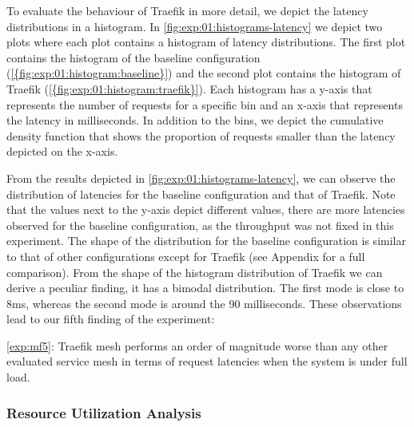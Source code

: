 To evaluate the behaviour of Traefik in more detail, we depict the latency distributions in a histogram. In \cref{fig:exp:01:histograms-latency} we depict two plots where each plot contains a histogram of latency distributions. The first plot contains the histogram of the baseline configuration (\cref{{fig:exp:01:histogram:baseline}}) and the second plot contains the histogram of Traefik  (\cref{{fig:exp:01:histogram:traefik}}). Each histogram has a y-axis that represents the number of requests for a specific bin and an x-axis that represents the latency in milliseconds. In addition to the bins, we depict the cumulative density function that shows the proportion of requests smaller than the latency depicted on the x-axis. 

From the results depicted in \cref{fig:exp:01:histograms-latency}, we can observe the distribution of latencies for the baseline configuration and that of Traefik. Note that the values next to the y-axis depict different values, there are more latencies observed for the baseline configuration, as the throughput was not fixed in this experiment. The shape of the distribution for the baseline configuration is similar to that of other configurations except for Traefik (see Appendix for a full comparison). From the shape of the histogram distribution of Traefik we can derive a peculiar finding, it has a bimodal distribution. The first mode is close to 8ms, whereas the second mode is around the 90 milliseconds. These observations lead to our fifth  finding of the experiment: 

\begin{shaded*}
    \noindent
    \ref{exp:mf5}: 
    Traefik mesh performs an order of magnitude worse than any other evaluated service mesh in terms of request latencies when the system is under full load.
\end{shaded*}

\subsubsection{Resource Utilization Analysis}
\label{sec:experiments:results:per-experiment:01:throughput}



